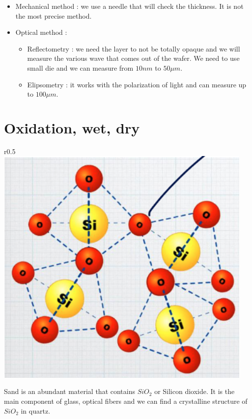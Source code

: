 \documentclass[
]{article}
\begin{document}
\begin{itemize}
\item
  Mechanical method : we use a needle that will check the thickness. It
  is not the most precise method.
\item
  Optical method :

  \begin{itemize}
  \item
    Reflectometry : we need the layer to not be totally opaque and we
    will measure the various wave that comes out of the wafer. We need
    to use small die and we can measure from \(10nm\) to \(50\mu m\).
  \item
    Elipsometry : it works with the polarization of light and can
    measure up to \(100\mu m\).
  \end{itemize}
\end{itemize}

\hypertarget{oxidation-wet-dry}{%
\section{Oxidation, wet, dry}\label{oxidation-wet-dry}}

r0.5
\includegraphics[width=0.95\textwidth,height=\textheight]{sio2_structure.png}

Sand is an abundant material that contains \(SiO_2\) or Silicon dioxide.
It is the main component of glass, optical fibers and we can find a
crystalline structure of \(SiO_2\) in quartz.
\end{document}
